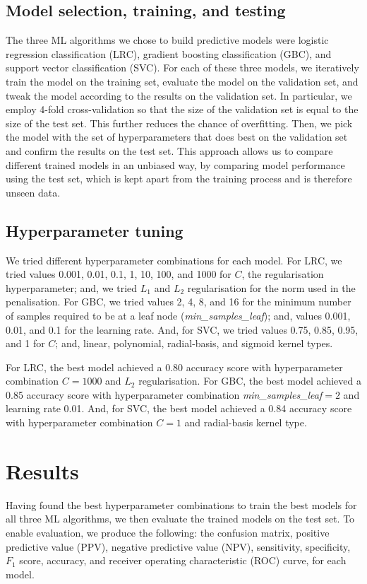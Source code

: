 \documentclass[twoside,11pt]{article}
\begin{document}
\subsection{Model selection, training, and testing}
The three ML algorithms we chose to build predictive models were logistic regression classification (LRC), gradient boosting classification (GBC), and support vector classification (SVC). For each of these three models, we iteratively train the model on the training set, evaluate the model on the validation set, and tweak the model according to the results on the validation set. In particular, we employ 4-fold cross-validation so that the size of the validation set is equal to the size of the test set. This further reduces the chance of overfitting. Then, we pick the model with the set of hyperparameters that does best on the validation set and confirm the results on the test set. This approach allows us to compare different trained models in an unbiased way, by comparing model performance using the test set, which is kept apart from the training process and is therefore unseen data.

\subsection{Hyperparameter tuning}
We tried different hyperparameter combinations for each model. For LRC, we tried values 0.001, 0.01, 0.1, 1, 10, 100, and 1000 for $C$, the regularisation hyperparameter; and, we tried $L_1$ and $L_2$ regularisation for the norm used in the penalisation. For GBC, we tried values 2, 4, 8, and 16 for the minimum number of samples required to be at a leaf node (\emph{min\_samples\_leaf}); and, values 0.001, 0.01, and 0.1 for the learning rate. And, for SVC, we tried values 0.75, 0.85, 0.95, and 1 for $C$; and, linear, polynomial, radial-basis, and sigmoid kernel types. 

For LRC, the best model achieved a 0.80 accuracy score with hyperparameter combination $C=1000$ and $L_2$ regularisation. For GBC, the best model achieved a 0.85 accuracy score with hyperparameter combination \emph{min\_samples\_leaf}$=2$ and learning rate 0.01. And, for SVC, the best model achieved a 0.84 accuracy score with hyperparameter combination $C=1$ and radial-basis kernel type. 

\section{Results}
Having found the best hyperparameter combinations to train the best models for all three ML algorithms, we then evaluate the trained models on the test set. To enable evaluation, we produce the following: the confusion matrix, positive predictive value (PPV), negative predictive value (NPV), sensitivity, specificity, $F_1$ score, accuracy, and receiver operating characteristic (ROC) curve, for each model.
\end{document}
